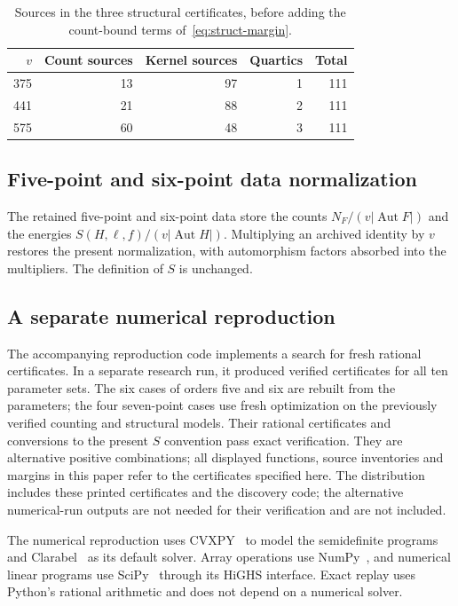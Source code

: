 \documentclass[11pt]{article}
\theoremstyle{remark}
\DeclareMathOperator{\Aut}{Aut}
\numberwithin{equation}{section}
\begin{document}
\begin{table}[H]
\centering
\caption{Sources in the three structural certificates, before adding the
count-bound terms of~\eqref{eq:struct-margin}.}
\label{tab:struct-certificates}
\begin{tabular}{rrrrr}
\toprule
$v$&Count sources&Kernel sources&Quartics&Total\\
\midrule
375&13&97&1&111\\
441&21&88&2&111\\
575&60&48&3&111\\
\bottomrule
\end{tabular}
\end{table}
\subsection{Five-point and six-point data normalization}
The retained five-point and six-point data store the counts $N_F/(v|\Aut F|)$ and the energies
$S(H,\ell,f)/(v|\Aut H|)$. Multiplying an archived identity by $v$ restores
the present normalization, with automorphism factors absorbed into the
multipliers. The definition of $S$ is unchanged.

\subsection{A separate numerical reproduction}
The accompanying reproduction code implements a search for fresh
rational certificates. In a separate research run, it produced verified
certificates for all ten parameter sets. The six cases of
orders five and six are rebuilt from the parameters; the four seven-point
cases use fresh optimization on the previously verified counting and
structural models. Their rational certificates and conversions to the
present $S$ convention pass exact verification. They are alternative
positive combinations; all displayed functions, source inventories and
margins in this paper refer to the certificates specified here.
The distribution includes these printed certificates and the discovery
code; the alternative numerical-run outputs are not needed for their
verification and are not included.

The numerical reproduction uses CVXPY~\cite{cvxpy} to model the
semidefinite programs and Clarabel~\cite{clarabel} as its default solver.
Array operations use NumPy~\cite{numpy}, and numerical linear programs
use SciPy~\cite{scipy} through its HiGHS interface. Exact replay uses
Python's rational arithmetic and does not depend on a numerical solver.
\end{document}
